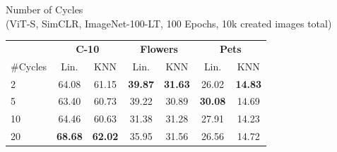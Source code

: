 \centering
\setlength{\tabcolsep}{2pt}
\caption{\centering Number of Cycles\\(ViT-S, SimCLR, ImageNet-100-LT, 100 Epochs, 10k created images total)}
{\begin{tabular}{l cc cc cc}
    \toprule
      & \multicolumn{2}{c}{\textbf{C-10}} &  \multicolumn{2}{c}{\textbf{Flowers}} &  \multicolumn{2}{c}{\textbf{Pets}} \\
     \cmidrule(r){2-3}
     \cmidrule(l){4-5}
     \cmidrule(l){6-7}
     \#Cycles  & Lin. & KNN & Lin. & KNN & Lin. & KNN \\
    \toprule
    
    \multirow{1}{*}{2} & 64.08   &  61.15 & \textbf{39.87} & \textbf{31.63} & 26.02 & \textbf{14.83} \\  
    \multirow{1}{*}{5} & 63.40 & 60.73 & 39.22 & 30.89 & \textbf{30.08} & 14.69\\
    \multirow{1}{*}{10} & 64.46 & 60.63 & 31.38 & 31.28 & 27.91 & 14.23 \\
    \multirow{1}{*}{20} & \textbf{68.68}   &  \textbf{62.02} & 35.95 & 31.56 & 26.56 & 14.72 \\  
    
    \bottomrule
\end{tabular}
\label{table:n_cycle_abl}}